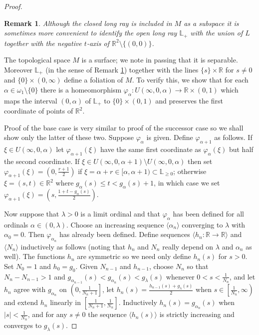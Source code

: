 \documentclass{amsart}
\newtheorem{rem}[theorem]{Remark}
\begin{document}
\begin{proof}
\begin{rem}\label{remattach}
{\rm Although the closed long ray is included in $M$ as a subspace it is sometimes more convenient to identify the open long ray ${\mathbb{L}}_+$ with the union of $L$ together with the negative $t$-axis of $\mathbb R^2\setminus\{(0,0)\}$.}
\end{rem}

The topological space $M$ is a surface; we note in passing that it is separable.  Moreover ${\mathbb{L}}_+$ (in the sense of Remark \ref{remattach}) together with the lines $\{s\}\times\mathbb R$ for $s\not=0$ and $\{0\}\times(0,\infty)$ define a foliation of $M$. To verify this, we show that for each $\alpha\in\omega_1\setminus\{0\}$ there is a homeomorphism $\varphi_\alpha:{U(\infty,0,\alpha)}\to\mathbb R\times(0,1)$ which maps the interval $(0,\alpha)$ of ${\mathbb{L}}_+$ to $\{0\}\times(0,1)$ and preserves the first coordinate of points of $\mathbb R^2$.

  Proof of the base case is very similar to proof of the successor case so we shall show only the latter of these two. 
  Suppose $\varphi_\alpha$ is given. Define $\varphi_{\alpha+1}$ as follows. 
  If $\xi\in{U(\infty,0,\alpha)}$ let $\varphi_{\alpha+1}(\xi)$ have the same first coordinate as $\varphi_\alpha(\xi)$ but half the second coordinate. 
  If $\xi\in{U(\infty,0,\alpha+1)}\setminus U(\infty,0,\alpha)$ then set $\varphi_{\alpha+1}(\xi)=(0,\frac{r+1}{2})$ if 
  $\xi=\alpha+r\in[\alpha,\alpha+1)\subset{\mathbb{L}}_{\ge0}$; otherwise $\xi=(s,t)\in\mathbb R^2$ where $g_\alpha(s)\le t< g_\alpha(s)+1$, 
  in which case we set $\varphi_{\alpha+1}(\xi)=\left(s,\frac{1+t-g_\alpha(s)}{2}\right)$.

  Now suppose that $\lambda>0$ is a limit ordinal and that $\varphi_\alpha$ has been defined for all ordinals $\alpha\in(0,\lambda)$. 
  Choose an increasing sequence $\langle\alpha_n\rangle$ converging to $\lambda$ with $\alpha_0=0$. 
  Then $\varphi_{\alpha_n}$ has already been defined. Define sequences $\langle h_n:\mathbb R\to\mathbb R\rangle$ and $\langle N_n\rangle$ 
  inductively as follows (noting that $h_n$ and $N_n$ really depend on $\lambda$ and $\alpha_n$ as well). 
  The functions $h_n$ are symmetric so we need only define $h_n(s)$ for $s>0$. 
  Set $N_0=1$ and $h_0=g_0$. Given $N_{n-1}$ and $h_{n-1}$, choose $N_n$ so that $N_n-N_{n-1}>1$ and 
  $g_{\alpha_{n-1}}(s)<g_{\alpha_n}(s)<g_\lambda(s)$ whenever $0<s<\frac{1}{N_n}$, and let $h_n$ agree with 
  $g_{\alpha_n}$ on $\left(0,\frac{1}{N_n+1}\right]$, let $h_n(s)=\frac{h_{n-1}(s)+g_\lambda(s)}{2}$ when $s\in\left[\frac{1}{N_n},\infty\right)$ 
  and extend $h_n$ linearly in $\left[\frac{1}{N_n+1},\frac{1}{N_n}\right]$. 
  Inductively $h_n(s)=g_{\alpha_n}(s)$ when $|s|<\frac{1}{N_n}$, and for any $s\not=0$ the sequence $\langle h_n(s)\rangle$ is strictly 
  increasing and converges to $g_\lambda(s)$.


\end{proof}
\end{document}
